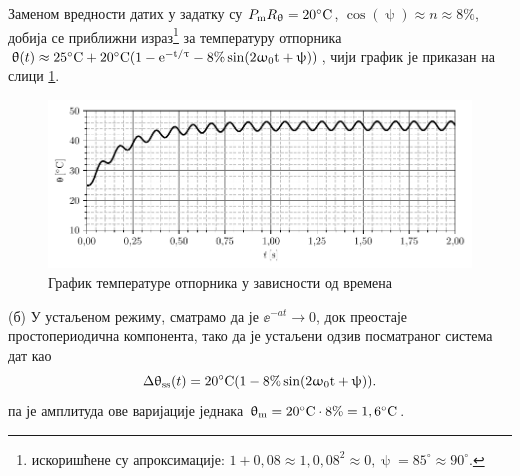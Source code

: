 Заменом вредности датих у задатку су 
${P_{\rm m} R_{\uptheta}} = 20^\circ\rm C$,
$\cos(\uppsi) \approx n \approx 8\%$, добија се приближни израз\footnote{
    искоришћене су апроксимације: $1 + 0,08\approx 1, 0,08^2 \approx 0, \uppsi = 85^\circ \approx 90^\circ$.
}
за температуру отпорника 
$
    \uptheta(t) \approx 25^\circ{\rm C} + 
    20^\circ\rm C( 1 - {\rm e}^{-t/\uptau} - 8\% \sin(2\upomega_0 t + \uppsi) )
$, чији график је приказан на слици \ref{fig:\ID.}.

\begin{figure}[!ht]
\centering
\includegraphics{fig/temperatura.pdf}
\caption{График температуре отпорника у зависности од времена}
\label{fig:\ID.}
\end{figure}

(б) У устаљеном режиму, сматрамо да је $\ee^{-at} \to 0$, док преостаје простопериодична компонента, тако да је 
устаљени одзив посматраног система дат као 
\begin{equation}
    \Delta\uptheta_{\rm ss}(t) =  20^\circ\rm C( 1 - 8\% \sin(2\upomega_0 t + \uppsi) ).
\end{equation}
па је амплитуда ове варијације једнака $\uptheta_{\rm m} = 20^\circ\rm C \cdot 8\% = 1,6^\circ\rm C$. 

